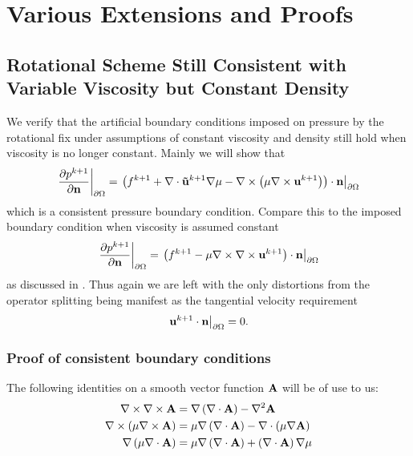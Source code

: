 \documentclass[letterpaper]{erdc}
\begin{document}
\appendix
\chapter{Various Extensions and Proofs}

\section{Rotational Scheme Still Consistent with Variable Viscosity but Constant Density}
We verify that the artificial boundary conditions imposed on pressure by the rotational fix under assumptions of constant viscosity and density still hold when viscosity is no longer constant.  Mainly we will show that 
\begin{equation}
  \left.\frac{\partial p^{k+1}}{\partial \textbf{n}}\right|_{\partial\Omega} = \left.\left(f^{k+1} + \nabla\cdot\mathbf{\tilde{u}}^{k+1}\nabla\mu - \nabla\times\left(\mu\nabla\times \textbf{u}^{k+1}  \right)  \right)\cdot \textbf{n}\right|_{\partial\Omega}
\end{equation}
which is a consistent pressure boundary condition.  Compare this to the imposed boundary condition when viscosity is assumed constant
\begin{equation}
  \left.\frac{\partial p^{k+1}}{\partial \textbf{n}}\right|_{\partial\Omega} = \left.\left(f^{k+1} - \mu\nabla\times\nabla\times \textbf{u}^{k+1} \right)\cdot \textbf{n}\right|_{\partial\Omega}
\end{equation}
 as discussed in \cite{guermond2004error}.  Thus again we are left with the only distortions from the operator splitting being manifest as the tangential velocity requirement
\begin{equation}
  \left.\textbf{u}^{k+1}\cdot\textbf{n}\right|_{\partial\Omega} = 0.
\end{equation}

%
%
\subsection{Proof of consistent boundary conditions}
The following identities on a smooth vector function $\mathbf{A}$ will be of use to us:
\begin{align}
  \nabla\times\nabla\times \mathbf{A} &= \nabla\left( \nabla\cdot \mathbf{A}\right) - \nabla^2 \mathbf{A}\label{eqn:curlcurlidentity}\\
  \nabla\times\left( \mu \nabla\times \mathbf{A} \right) &= \mu\nabla\left(\nabla\cdot \mathbf{A}\right) - \nabla\cdot\left(\mu \nabla \mathbf{A} \right)\label{eqn:curlmucurlidentity}\\
  \nabla\left( \mu \nabla\cdot \mathbf{A}\right) &= \mu\nabla\left(\nabla\cdot \mathbf{A}\right) + \left( \nabla\cdot \mathbf{A}\right)\nabla\mu\label{eqn:gradmudividentity}
\end{align}
\end{document}
